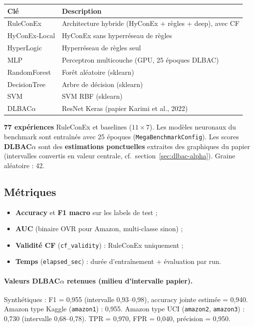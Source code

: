 \documentclass[11pt,a4paper]{article}
\begin{document}
\begin{center}
\small
\begin{tabular}{@{}ll@{}}
\toprule
\textbf{Clé} & \textbf{Description} \\
\midrule
RuleConEx & Architecture hybride (HyConEx + règles + deep), avec CF \\
HyConEx-Local & HyConEx sans hyperréseau de règles \\
HyperLogic & Hyperréseau de règles seul \\
MLP & Perceptron multicouche (GPU, 25 époques DLBAC) \\
RandomForest & Forêt aléatoire (sklearn) \\
DecisionTree & Arbre de décision (sklearn) \\
SVM & SVM RBF (sklearn) \\
DLBAC$\alpha$ & ResNet Keras (papier Karimi et al., 2022) \\
\bottomrule
\end{tabular}
\end{center}


\textbf{77 expériences} RuleConEx et baselines ($11 \times 7$). Les modèles neuronaux du benchmark sont entraînés avec 25 époques (\texttt{MegaBenchmarkConfig}). Les scores \textbf{DLBAC$\alpha$} sont des \textbf{estimations ponctuelles} extraites des graphiques du papier (intervalles convertis en valeur centrale, cf.\ section~\ref{sec:dlbac-alpha}). Graine aléatoire : 42.

\subsection{Métriques}

\begin{itemize}
  \item \textbf{Accuracy} et \textbf{F1 macro} sur les labels de test ;
  \item \textbf{AUC} (binaire OVR pour Amazon, multi-classe sinon) ;
  \item \textbf{Validité CF} (\texttt{cf\_validity}) : RuleConEx uniquement ;
  \item \textbf{Temps} (\texttt{elapsed\_sec}) : durée d'entraînement + évaluation par run.
\end{itemize}

\paragraph{Valeurs DLBAC$\alpha$ retenues (milieu d'intervalle papier).}
Synthétiques : F1 = 0,955 (intervalle 0,93--0,98), accuracy jointe estimée = 0,940. Amazon type Kaggle (\texttt{amazon1}) : 0,955. Amazon type UCI (\texttt{amazon2}, \texttt{amazon3}) : 0,730 (intervalle 0,68--0,78). TPR = 0,970, FPR = 0,040, précision = 0,950.
\end{document}
